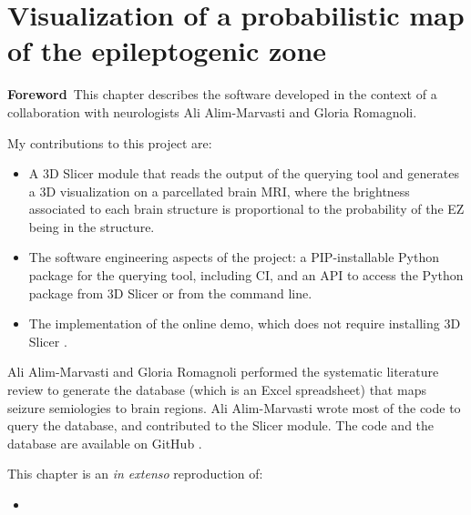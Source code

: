 \chapter[Visualization of a probabilistic map of the epileptogenic zone]{Visualization of a probabilistic map of the epileptogenic zone}

\label{chap:svt}

\minitoc


\begin{center}
  \begin{minipage}[b]{0.9\linewidth}
    \small
    \textbf{Foreword\,}
    This chapter describes the software developed in the context of a collaboration with neurologists Ali Alim-Marvasti and Gloria Romagnoli.

    My contributions to this project are:
    \begin{itemize}
      \item A 3D Slicer module \cite{fedorov_3d_2012} that reads the output of the querying tool and generates a 3D visualization on a parcellated brain \ac{MRI}, where the brightness associated to each brain structure is proportional to the probability of the \ac{EZ} being in the structure.
      \item The software engineering aspects of the project: a \ac{PIP}-installable Python package for the querying tool, including \ac{CI}, and an \ac{API} to access the Python package from 3D Slicer or from the command line.
      \item The implementation of the online demo, which does not require installing 3D Slicer%
      .
    \end{itemize}
  \end{minipage}

  \begin{minipage}[b]{0.9\linewidth}
    \small
    Ali Alim-Marvasti and Gloria Romagnoli performed the systematic literature review to generate the database (which is an Excel spreadsheet) that maps seizure semiologies to brain regions.
    Ali Alim-Marvasti wrote most of the code to query the database, and contributed to the Slicer module.
    The code and the database are available on GitHub%
    \fnurl{\svtgithub}.

    This chapter is an \textit{in extenso} reproduction of:
    \begin{itemize}
      \item {}
    \end{itemize}


\end{minipage}
\end{center}
